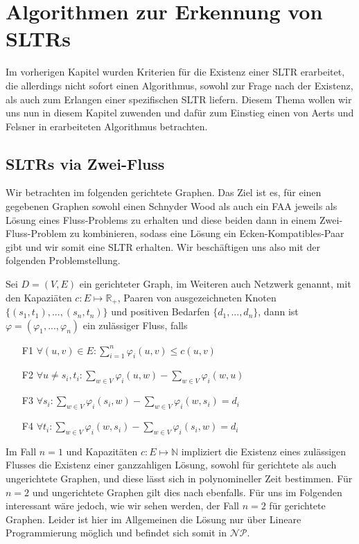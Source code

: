 \chapter{Algorithmen zur Erkennung von SLTRs}

Im vorherigen Kapitel wurden Kriterien für die Existenz einer SLTR erarbeitet, die allerdings nicht sofort einen Algorithmus, sowohl zur Frage nach der Existenz, als auch zum Erlangen einer spezifischen SLTR liefern. Diesem Thema wollen wir uns nun in diesem Kapitel zuwenden und dafür zum Einstieg einen von Aerts und Felsner in \cite{af15} erarbeiteten Algorithmus betrachten.

\section{SLTRs via Zwei-Fluss}

Wir betrachten im folgenden gerichtete Graphen. Das Ziel ist es, für einen gegebenen Graphen sowohl einen Schnyder Wood als auch ein FAA jeweils als Lösung eines Fluss-Problems zu erhalten und diese beiden dann in einem Zwei-Fluss-Problem zu kombinieren, sodass eine Lösung ein Ecken-Kompatibles-Paar gibt und wir somit eine SLTR erhalten. Wir beschäftigen uns also mit der folgenden Problemstellung.

\begin{definition}
Sei $D=(V,E)$ ein gerichteter Graph, im Weiteren auch Netzwerk genannt, mit den Kapaziäten $c:E\mapsto\mathbb{R}_{+}$, Paaren von ausgezeichneten Knoten $\{(s_1,t_1), ... ,(s_n,t_n)\}$ und positiven Bedarfen $\{d_1, ... ,d_n\}$, dann ist $\varphi=(\varphi_1, ... ,\varphi_n)$ ein zulässiger Fluss, falls
\begin{itemize}
\item[F1] $\forall (u,v) \in E : \sum_{i=1}^{n}{\varphi_i(u,v)} \leq c(u,v) $
\item[F2] $ \forall u \neq s_i,t_i : \sum_{w \in V} \varphi_i(u,w) - \sum_{w \in V} \varphi_i(w,u) $
\item[F3] $ \forall s_i : \sum_{w \in V} \varphi_i(s_i,w) - \sum_{w \in V} \varphi_i(w,s_i) = d_i $
\item[F4] $ \forall t_i : \sum_{w \in V} \varphi_i(w,s_i) - \sum_{w \in V} \varphi_i(s_i,w) = d_i $
\end{itemize}
\end{definition}

\begin{remark}
Im Fall $n=1$ und Kapazitäten $c:E\mapsto\mathbb{N}$ impliziert die Existenz eines zulässigen Flusses die Existenz einer ganzzahligen Lösung, sowohl für gerichtete als auch ungerichtete Graphen, und diese lässt sich in polynomineller Zeit bestimmen. Für $n=2$ und ungerichtete Graphen gilt dies nach \cite{hu} ebenfalls. Für uns im Folgenden interessant wäre jedoch, wie wir sehen werden, der Fall $n=2$ für gerichtete Graphen. Leider ist hier im Allgemeinen die Lösung nur über Lineare Programmierung möglich und befindet sich somit in $\mathcal{NP}$.
\end{remark}


